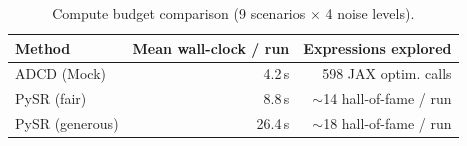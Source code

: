 \begin{table}[t]
\centering
\caption{Compute budget comparison (9 scenarios $\times$ 4 noise levels).}
\label{tab:runtime}
\begin{tabular}{l r r}
\toprule
\textbf{Method} & \textbf{Mean wall-clock / run} & \textbf{Expressions explored} \\
\midrule
ADCD (Mock) & 4.2\,s & 598 JAX optim. calls \\
PySR (fair) & 8.8\,s & $\sim$14 hall-of-fame / run \\
PySR (generous) & 26.4\,s & $\sim$18 hall-of-fame / run \\
\bottomrule
\end{tabular}
\end{table}